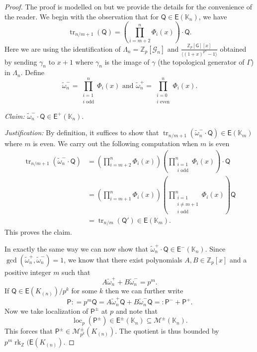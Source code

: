 \documentclass{amsart}
\numberwithin{equation}{section}
\theoremstyle{remark}
\newcommand{\rk}{\operatorname{rk}}
\newcommand{\tr}{\operatorname{tr}}
\newcommand{\EC}{\mathsf{E}}
\newcommand{\cG}{\mathcal{G}}
\newcommand{\cM}{\mathcal{M}}
\newcommand{\sG}{\mathsf{G}}
\newcommand{\Kn}{\mathbb{K}_{n}}
\newcommand{\K}{\mathbb{K}}
\newcommand{\Zp}{\mathbb{Z}_p}
\newcommand{\Z}{\mathbb{Z}}
\theoremstyle{plain} %
\begin{document}
\begin{proof}
The proof is modelled on \cite[Lemma~6.5]{Lei23} but we provide the details for the convenience of the reader.
We begin with the observation that for $\mathsf{Q} \in \EC(\Kn)$, we have
\[
\tr_{n/m+1}(\mathsf{Q}) = \left(\prod_{i=m+2}^n \Phi_i(x)\right) \cdot \mathsf{Q}.
\]
Here we are using the identification of $\Lambda_n = \Zp[\cG_n]$ and $\frac{\Zp[\sG][x]}{\langle (1+x)^{p^n} - 1\rangle}$ obtained by sending $\gamma_n$ to $x+1$ where $\gamma_n$ is the image of $\gamma$ (the topological generator of $\Gamma$) in $\Lambda_n$.
Define
\[
\widetilde{\omega}_n^- = \prod_{\substack{i=1\\ i \text{ odd}}}^n \Phi_i(x) \text{ and } \widetilde{\omega}_n^+ = \prod_{\substack{i=0\\ i \text{ even}}}^n \Phi_i(x).
\]

\noindent \emph{Claim:} $\widetilde{\omega}_n^- \cdot \mathsf{Q} \in \EC^{+}(\K_n)$.

\noindent \emph{Justification:} By definition, it suffices to show that $\tr_{n/m+1}(\widetilde{\omega}_n^- \cdot \mathsf{Q}) \in \EC(\K_m)$ where $m$ is even.
We carry out the following computation when $m$ is even
\begin{align*}
    \tr_{n/m+1}(\widetilde{\omega}_n^- \cdot \mathsf{Q}) & = \left(\prod_{i=m+2}^n \Phi_i(x)\right) \left(\prod_{\substack{i=1\\ i \text{ odd}}}^n \Phi_i(x)\right)  \cdot\mathsf{Q} \\
    & = \left(\prod_{i=m+1}^n \Phi_i(x)\right) \left(\prod_{\substack{i=1\\ i\neq m+1\\i \text{ odd}}}^n \Phi_i(x)\right) \mathsf{Q}\\
    & = \tr_{n/m}(\mathsf{Q}') \in \EC(\K_m).
\end{align*}
This proves the claim.

In exactly the same way we can now show that $\widetilde{\omega}_n^+ \cdot \mathsf{Q} \in \EC^{-}(\K_n)$.
Since $\gcd(\widetilde{\omega}_n^+ , \widetilde{\omega}_n^-) = 1$, we know that there exist polynomials $A,B \in \Zp[x]$ and a positive integer $m$ such that
\[
A\widetilde{\omega}_n^+ + B \widetilde{\omega}_n^- = p^m.
\]
If $\mathsf{Q} \in \EC(K_{(n)})/p^k$ for some $k$ then we can further write
\[
\mathsf{P} : = p^m \mathsf{Q} = A\widetilde{\omega}_n^+ \mathsf{Q} + B \widetilde{\omega}_n^-\mathsf{Q} =: \mathsf{P}^- + \mathsf{P}^+.
\]
Now we take localization of $\mathsf{P}^{\pm}$ at $p$ and note that
\[
\operatorname{loc}_p(\mathsf{P}^{\pm}) \in \EC^{\pm}(\Kn) \subseteq \cM^{\pm}(\Kn).
\]
This forces that $\mathsf{P}^{\pm} \in \cM^{\pm}_{p^k}(K_{(n)})$.
The quotient is thus bounded by $p^m \rk_{\Z}(\EC(K_{(n)})$.
\end{proof}
\end{document}
